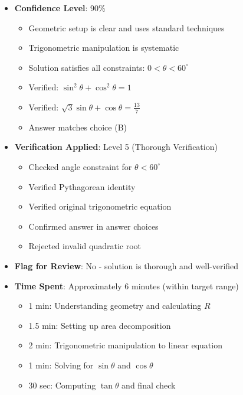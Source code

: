 \documentclass[12pt]{article}
\begin{document}
\begin{itemize}[leftmargin=*]
    \item \textbf{Confidence Level}: 90\%
    \begin{itemize}
        \item Geometric setup is clear and uses standard techniques
        \item Trigonometric manipulation is systematic
        \item Solution satisfies all constraints: $0 < \theta < 60^{\circ}$
        \item Verified: $\sin^2\theta + \cos^2\theta = 1$ \checkmark
        \item Verified: $\sqrt{3}\sin\theta + \cos\theta = \frac{13}{7}$ \checkmark
        \item Answer matches choice (B)
    \end{itemize}
    
    \item \textbf{Verification Applied}: Level 5 (Thorough Verification)
    \begin{itemize}
        \item Checked angle constraint for $\theta < 60^{\circ}$
        \item Verified Pythagorean identity
        \item Verified original trigonometric equation
        \item Confirmed answer in answer choices
        \item Rejected invalid quadratic root
    \end{itemize}
    
    \item \textbf{Flag for Review}: No - solution is thorough and well-verified
    
    \item \textbf{Time Spent}: Approximately 6 minutes (within target range)
    \begin{itemize}
        \item 1 min: Understanding geometry and calculating $R$
        \item 1.5 min: Setting up area decomposition
        \item 2 min: Trigonometric manipulation to linear equation
        \item 1 min: Solving for $\sin\theta$ and $\cos\theta$
        \item 30 sec: Computing $\tan\theta$ and final check
    \end{itemize}
\end{itemize}
\end{document}
